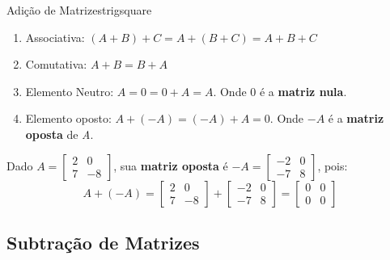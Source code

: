 \begin{proposition}{Adição de Matrizes}{trigsquare}
	\begin{enumerate}
		\item Associativa: $(A + B) + C = A + (B + C) = A + B + C$
		\item Comutativa: $A + B = B + A$
		\item Elemento Neutro: $A = 0 = 0 + A = A$. Onde $0$ é a \textbf{matriz nula}.
		\item Elemento oposto: $A + (-A) = (-A) + A = 0$. Onde $-A$ é a \textbf{matriz oposta} de \textit{A}.
	\end{enumerate}
\end{proposition}

\begin{example}
	Dado $A = \begin{bmatrix}
			2 & 0  \\
			7 & -8
		\end{bmatrix}$,
	sua \textbf{matriz oposta} é $-A = \begin{bmatrix}
			-2 & 0 \\
			-7 & 8
		\end{bmatrix}$, pois:
	\begin{equation*}
		A + (-A) = \begin{bmatrix}
			2 & 0  \\
			7 & -8
		\end{bmatrix} + \begin{bmatrix}
			-2 & 0 \\
			-7 & 8
		\end{bmatrix} = \begin{bmatrix}
			0 & 0 \\
			0 & 0
		\end{bmatrix}
	\end{equation*}
\end{example}

\subsection{Subtração de Matrizes}

